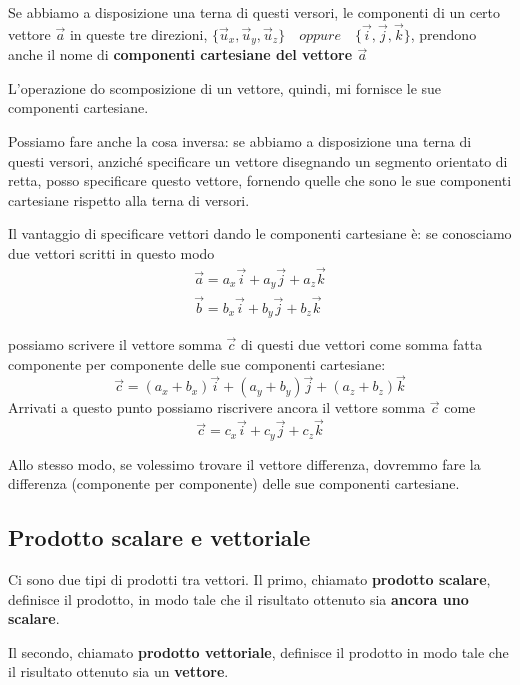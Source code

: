 \documentclass[a4paper]{book}
\begin{document}
Se abbiamo a disposizione una terna di questi versori, le componenti di un certo vettore $\overrightarrow{a}$ in queste tre direzioni, $\lbrace\overrightarrow{u}_{x}, \overrightarrow{u}_{y},  \overrightarrow{u}_{z}\rbrace \quad oppure \quad \lbrace \overrightarrow{i}, \overrightarrow{j}, \overrightarrow{k}\rbrace $, prendono anche il nome di \textbf{componenti cartesiane del vettore $\overrightarrow{a}$}

L'operazione do scomposizione di un vettore, quindi, mi fornisce le sue componenti cartesiane.

Possiamo fare anche la cosa inversa: se abbiamo a disposizione una terna di questi versori, anziché specificare un vettore disegnando un segmento orientato di retta, posso specificare questo vettore, fornendo quelle che sono le sue componenti cartesiane rispetto alla terna di versori.

Il vantaggio di specificare vettori dando le componenti cartesiane è: se conosciamo due vettori scritti in questo modo
\newpage
\begin{align*}
\overrightarrow{a} = a_{x} \overrightarrow{i} + a_{y} \overrightarrow{j} + a_{z} \overrightarrow{k} \\
 \overrightarrow{b} = b_{x} \overrightarrow{i} + b_{y} \overrightarrow{j} + b_{z} \overrightarrow{k}
\end{align*}
 
possiamo scrivere il vettore somma $\overrightarrow{c}$ di questi due vettori come somma fatta componente per componente delle sue componenti cartesiane:
$$ \overrightarrow{c} = (a_{x} + b_{x}) \overrightarrow{i} + (a_{y} + b_{y}) \overrightarrow{j} + (a_{z} + b_{z}) \overrightarrow{k} $$
Arrivati a questo punto possiamo riscrivere ancora il vettore somma $\overrightarrow{c}$ come
$$ \overrightarrow{c} = c_{x} \overrightarrow{i} + c_{y} \overrightarrow{j} + c_{z} \overrightarrow{k} $$

Allo stesso modo,  se volessimo trovare il vettore differenza, dovremmo fare la differenza (componente per componente) delle sue componenti cartesiane.

\subsection{Prodotto scalare e vettoriale}
Ci sono due tipi di prodotti tra vettori. Il primo, chiamato \textbf{prodotto scalare}, definisce il prodotto, in modo tale che il risultato ottenuto sia \textbf{ancora uno scalare}.

Il secondo, chiamato \textbf{prodotto vettoriale}, definisce il prodotto in modo tale che il risultato ottenuto sia un \textbf{vettore}.
\end{document}
